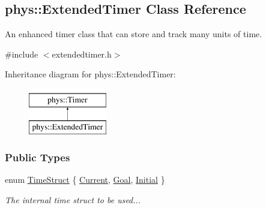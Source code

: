 \hypertarget{classphys_1_1ExtendedTimer}{
\subsection{phys::ExtendedTimer Class Reference}
\label{classphys_1_1ExtendedTimer}
}


An enhanced timer class that can store and track many units of time.  




{\ttfamily \#include $<$extendedtimer.h$>$}

Inheritance diagram for phys::ExtendedTimer:\begin{figure}[H]
\begin{center}
\leavevmode
\includegraphics[height=2.000000cm]{classphys_1_1ExtendedTimer}
\end{center}
\end{figure}
\subsubsection*{Public Types}
\begin{DoxyCompactItemize}
\item 
enum \hyperlink{classphys_1_1ExtendedTimer_a0f316e9347d1c118a157cc3c737c554b}{TimeStruct} \{ \hyperlink{classphys_1_1ExtendedTimer_a0f316e9347d1c118a157cc3c737c554bab42e601e90bdd3d9a40e8bd2203748f4}{Current}, 
\hyperlink{classphys_1_1ExtendedTimer_a0f316e9347d1c118a157cc3c737c554ba7179bcde29cd5fdda024ebe5f42207ae}{Goal}, 
\hyperlink{classphys_1_1ExtendedTimer_a0f316e9347d1c118a157cc3c737c554baca4dbfbcf56212e4df189c571d9718b3}{Initial}
 \}
\begin{DoxyCompactList}\small\item\em The internal time struct to be used... \item\end{DoxyCompactList}\end{DoxyCompactItemize}
